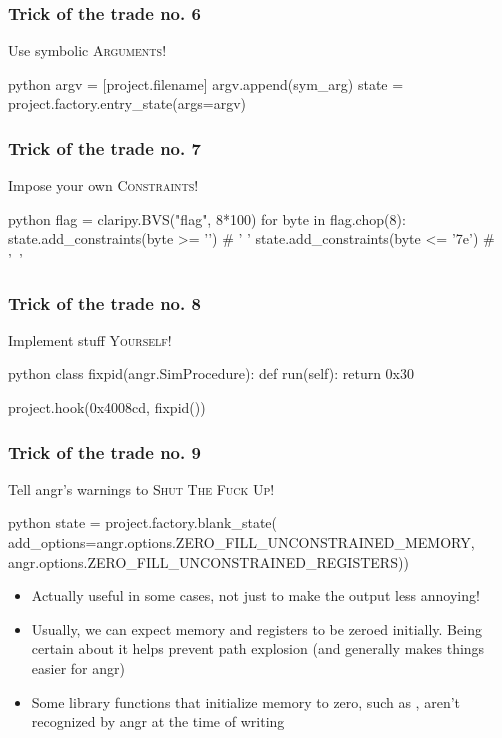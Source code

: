 \documentclass[aspectratio=169]{beamer}
\begin{document}
\begin{frame}[fragile]
	\frametitle{Trick of the trade no. 6}
	\begin{center}
		{\Large Use symbolic \textsc{Arguments}!}
	\end{center}
	\begin{codebox}{python}
argv = [project.filename]
argv.append(sym_arg)
state = project.factory.entry_state(args=argv)\end{codebox}
\end{frame}


\begin{frame}[fragile]
	\frametitle{Trick of the trade no. 7}
	\begin{center}
		{\Large Impose your own \textsc{Constraints}!}
	\end{center}
	\begin{codebox}{python}
flag = claripy.BVS("flag", 8*100)
for byte in flag.chop(8):
        state.add_constraints(byte >= '') # ' '
        state.add_constraints(byte <= '\x7e') # '~' \end{codebox}
\end{frame}


\begin{frame}[fragile]
	\frametitle{Trick of the trade no. 8}
	\begin{center}
		{\Large Implement stuff \textsc{Yourself}!}
	\end{center}
	\begin{codebox}{python}
class fixpid(angr.SimProcedure):
	def run(self):
		return 0x30

project.hook(0x4008cd, fixpid())\end{codebox}
\end{frame}



\begin{frame}[fragile]
	\frametitle{Trick of the trade no. 9}
	\begin{center}
		{\Large Tell angr's warnings to \textsc{Shut The Fuck Up}!}
	\end{center}
	\begin{codebox}{python}
state = project.factory.blank_state(
    add_options={angr.options.ZERO_FILL_UNCONSTRAINED_MEMORY,
                 angr.options.ZERO_FILL_UNCONSTRAINED_REGISTERS}))\end{codebox}
    \begin{itemize}
        \pause
        \item Actually useful in some cases, not just to make the output less annoying!
        \pause
        \item Usually, we can expect memory and registers to be zeroed initially. Being certain about it helps prevent path explosion
        (and generally makes things easier for angr)
        \pause
        \item Some library functions that initialize memory to zero, such as ,
            aren't recognized by angr {\tiny at the time of writing}
    \end{itemize}
\end{frame}
\end{document}

